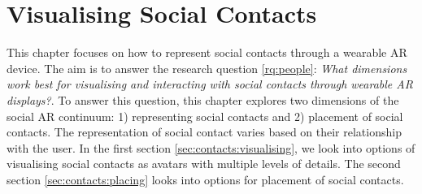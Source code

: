 \chapter{Visualising Social Contacts}
\label{ch:contacts} 

This chapter focuses on how to represent social contacts through a wearable AR device. The aim is to answer the research question \ref{rq:people}: \textit{What dimensions work best for visualising and interacting with social contacts through wearable AR displays?}. To answer this question, this chapter explores two dimensions of the social AR continuum: 1) representing social contacts and 2) placement of social contacts. The representation of social contact varies based on their relationship with the user. 
In the first section \ref{sec:contacts:visualising}, we look into options of visualising social contacts as avatars with multiple levels of details. The second section \ref{sec:contacts:placing} looks into options for placement of social contacts. 





